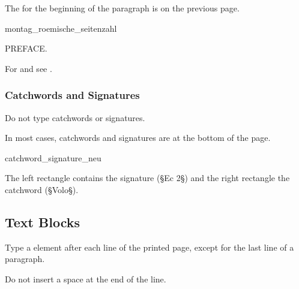 \begin{note}
The  for the beginning of the paragraph is on the previous page.
\end{note}

\vspace{3mm}
\begin{sampleImage}{montag_roemische_seitenzahl}
\begin{typeLatin}
PREFACE.
\end{typeLatin}
\end{sampleImage}

\begin{crossref}
For  and  see .
\end{crossref}

\subsubsection{Catchwords and Signatures}
\label{section catchwords and signatures}

\begin{mainrule}
Do not type catchwords or signatures.
\end{mainrule}

\begin{clarification}
In most cases, catchwords and signatures are at the bottom of the page.
\end{clarification}

\begin{sampleImage}{catchword_signature_neu}

\notTranscribed

The left rectangle contains the signature (§Ec 2§) and the right rectangle the catchword (§Volo§).
\end{sampleImage}


\tocspace
\subsection{Text Blocks}
\label{textblocks}
\begin{mainrule}
Type a  element after each line of the printed page, except for the last line of a paragraph.
\end{mainrule}

\begin{clarification}
Do not insert a space at the end of the line.
\end{clarification}

